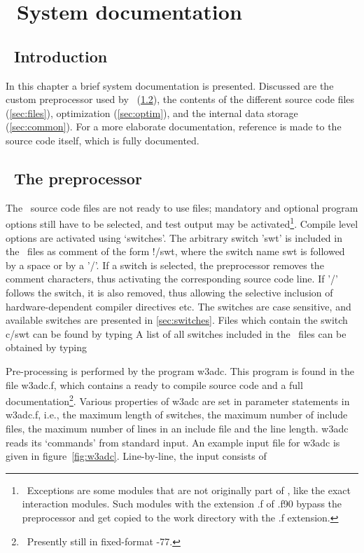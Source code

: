 
\section{~System documentation} \label{chapt:sys}
\newcounters
\vssub
\subsection{~Introduction}
\vssub

In this chapter a brief system documentation is presented. Discussed are the
custom preprocessor used by \ws\ (\para\ref{sec:w3adc}), the contents of the
different source code files (\para\ref{sec:files}), optimization
(\para\ref{sec:optim}), and the internal data storage
(\para\ref{sec:common}). For a more elaborate documentation, reference is made
to the source code itself, which is fully documented.

\vssub
\subsection{~The preprocessor} \label{sec:w3adc}
\vssub

The \ws\ source code files are not ready to use {\fortran} files; mandatory
and optional program options still have to be selected, and test output may be
activated\footnote{~Exceptions are some modules that are not originally part
of \ws, like the exact interaction modules. Such modules with the extension
{\file .f} of {\file .f90} bypass the preprocessor and get copied to the work
directory with the {\file .f} extension.}. Compile level options are activated
using `switches'. The arbitrary switch '{\F swt}' is included in the \ws\
files as comment of the form {\F !/swt}, where the switch name {\F swt} is
followed by a space or by a '{\F /}'. If a switch is selected, the
preprocessor removes the comment characters, thus activating the corresponding
source code line. If '{\F/}' follows the switch, it is also removed, thus
allowing the selective inclusion of hardware-dependent compiler directives
etc. The switches are case sensitive, and available switches are presented in
\para\ref{sec:switches}. Files which contain the switch {\F c/swt} can be
found by typing \command{find\_switch '!/SWT'} A list of all switches included
in the \ws\ files can be obtained by typing \command{all\_switches}

\pb

Pre-processing is performed by the program {\code w3adc}. This program is
found in the file {\file w3adc.f}, which contains a ready to compile
{\fortran} source code and a full documentation\footnote{~Presently still in
fixed-format {\fortran}-77.}. Various properties of {\code w3adc} are set in
{\F parameter} statements in {\file w3adc.f}, i.e., the maximum length of
switches, the maximum number of include files, the maximum number of lines in
an include file and the line length. {\code w3adc} reads its `commands' from
standard input. An example input file for {\code w3adc} is given in
figure~\ref{fig:w3adc}. Line-by-line, the input consists of

